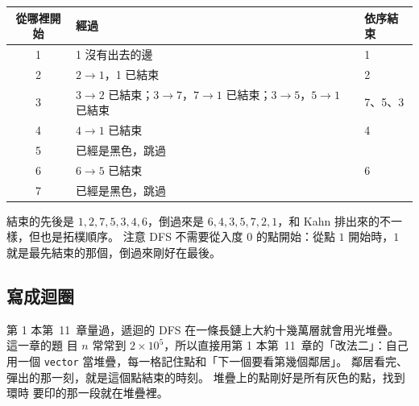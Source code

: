 \begin{center}
\begin{tabular}{cll}
\toprule
從哪裡開始 & 經過 & 依序結束 \\
\midrule
1 & 1 沒有出去的邊 & 1 \\
2 & $2 \to 1$，1 已結束 & 2 \\
3 & $3 \to 2$ 已結束；$3 \to 7$，$7 \to 1$ 已結束；$3 \to 5$，$5 \to 1$ 已結束
& 7、5、3 \\
4 & $4 \to 1$ 已結束 & 4 \\
5 & 已經是黑色，跳過 & \\
6 & $6 \to 5$ 已結束 & 6 \\
7 & 已經是黑色，跳過 & \\
\bottomrule
\end{tabular}
\end{center}

結束的先後是 $1, 2, 7, 5, 3, 4, 6$，倒過來是 $6, 4, 3, 5, 7, 2, 1$，和 Kahn
排出來的不一樣，但也是拓樸順序。 注意 DFS 不需要從入度 $0$ 的點開始：從點 $1$
開始時，$1$ 就是最先結束的那個，倒過來剛好在最後。

\subsection{寫成迴圈}

第 1 本第~11~章量過，遞迴的 DFS 在一條長鏈上大約十幾萬層就會用光堆疊。 這一章的題
目 $n$ 常常到 $2 \times 10^5$，所以直接用第 1 本第~11~章的「改法二」：自己用一個
\texttt{vector} 當堆疊，每一格記住點和「下一個要看第幾個鄰居」。 鄰居看完、
彈出的那一刻，就是這個點結束的時刻。 堆疊上的點剛好是所有灰色的點，找到環時
要印的那一段就在堆疊裡。

